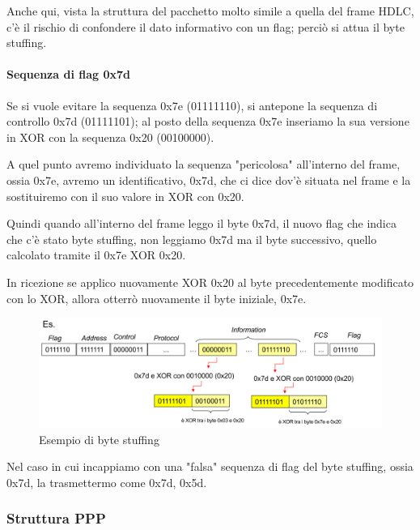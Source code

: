     Anche qui, vista la struttura del pacchetto molto simile a quella del frame HDLC, c'è il rischio di confondere il dato informativo con un flag; perciò si attua il byte stuffing.

    \paragraph{Sequenza di flag 0x7d}

    Se si vuole evitare la sequenza 0x7e (01111110), si antepone la sequenza di controllo 0x7d (01111101); al posto della sequenza 0x7e inseriamo la sua versione in XOR con la sequenza 0x20 (00100000).
    
    A quel punto avremo individuato la sequenza "pericolosa" all'interno del frame, ossia 0x7e, avremo un identificativo, 0x7d, che ci dice dov'è situata nel frame e la sostituiremo con il suo valore in XOR con 0x20.
     
    Quindi quando all'interno del frame leggo il byte 0x7d, il nuovo flag che indica che c'è stato byte stuffing, non leggiamo 0x7d ma il byte successivo, quello calcolato tramite il 0x7e XOR 0x20.

    In ricezione se applico nuovamente XOR 0x20 al byte precedentemente modificato con lo XOR, allora otterrò nuovamente il byte iniziale, 0x7e.
    
    
    
    \begin{figure}[htbp]
        \centering
        \includegraphics[width=1\textwidth]{images/bytestuffing.png}
        \caption{Esempio di byte stuffing}
        \label{fig:byte-stuffing}
    \end{figure}

    Nel caso in cui incappiamo con una "falsa" sequenza di flag del byte stuffing, ossia 0x7d, la trasmettermo come 0x7d, 0x5d.
     
    \subsubsection{Struttura PPP}

